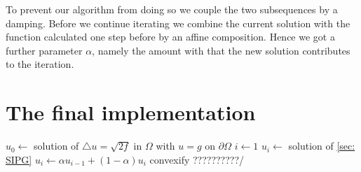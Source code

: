 To prevent our algorithm from doing so we couple the two subsequences by a damping. Before we continue iterating we combine the current solution with the function calculated one step before by an affine composition. Hence we got a further parameter $\alpha$, namely the amount with that the new solution contributes to the iteration.




\section{The final implementation}

\begin{algorithmic}
\State $u_0\gets $ solution of  $
	\triangle u = \sqrt{2f} \text{ in } \Omega $ with $
	u = g \text{ on }\partial \Omega$
\State $i \gets 1$
	\State $u_i \gets$ solution of \ref{sec: SIPG}
	\State $u_i \gets \alpha u_{i-1} + (1-\alpha)u_i $
	\State convexify ??????????/
\EndWhile
\end{algorithmic}


